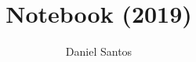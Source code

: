 \documentclass[pt]{extarticle}
\title{\vspace{-4ex}\Large{Notebook (2019)}}
\author{Daniel Santos}
\date{}
\begin{document}
\begin{landscape}
\begin{multicols}{2}

\maketitle
\vspace{-13ex}
\tableofcontents
\pagestyle{fancy}



\end{multicols}
\end{landscape}
\end{document}
